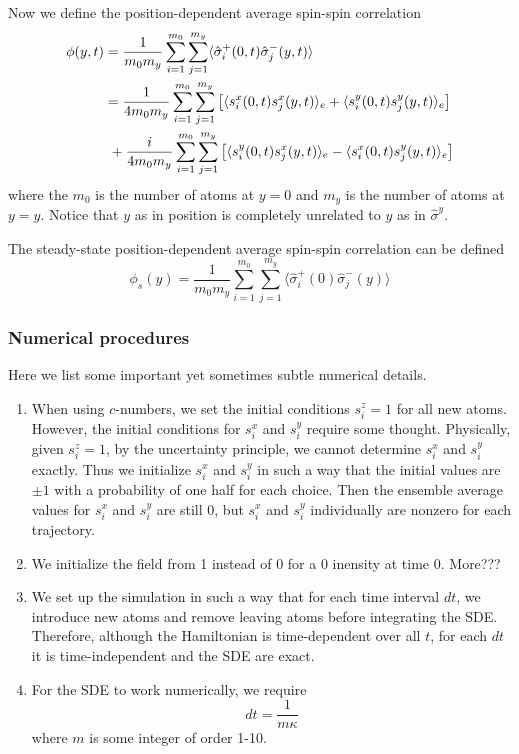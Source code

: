 \documentclass{article}
\begin{document}
\begin{enumerate}
    Now we define the position-dependent average spin-spin correlation
    \begin{align}
        \phi(y,t) &= \frac{1}{m_{0}m_{y}}\sum_{i=1}^{m_0}\sum_{j=1}^{m_y}\langle \hat{\sigma}_i^+(0,t)\hat{\sigma}_j^-(y,t)\rangle\\
        \notag          &=\frac{1}{4m_{0}m_{y}}\sum_{i=1}^{m_0}\sum_{j=1}^{m_y}\left[\langle s_i^x(0,t) s_j^x(y,t)\rangle_e+\langle s_i^y(0,t) s_j^y(y,t)\rangle_e \right]\\
        \notag          &\ +\frac{i}{4m_{0}m_{y}}\sum_{i=1}^{m_0}\sum_{j=1}^{m_y}\left[\langle s_i^y(0,t)s_j^x(y,t)\rangle_e-\langle s_i^x(0,t)s_j^y(y,t)\rangle_e \right]
    \end{align}
    where the $m_0$ is the number of atoms at $y=0$ and $m_y$ is the number of atoms at $y=y$. Notice that $y$ as in position is completely unrelated to $y$ as in $\hat{\sigma}^y$.
    
    The steady-state position-dependent average spin-spin correlation can be defined
    \begin{equation}
        \phi_s(y) = \frac{1}{m_{0}m_{y}}\sum_{i=1}^{m_0}\sum_{j=1}^{m_y}\langle \hat{\sigma}_i^+(0)\hat{\sigma}_j^-(y)\rangle
    \end{equation}
\end{enumerate}
\subsubsection{Numerical procedures}
Here we list some important yet sometimes subtle numerical details. 
\begin{enumerate}
    \item When using $c$-numbers, we set the initial conditions $s_i^z =1$ for all new atoms. However, the initial conditions for $s_i^x$ and $s_i^y$ require some thought. Physically, given $s_i^z =1$, by the uncertainty principle, we cannot determine $s_i^x$ and $s_i^y$ exactly. Thus we initialize $s_i^x$ and $s_i^y$ in such a way that the initial values are $\pm 1$ with a probability of one half for each choice. Then the ensemble average values for $s_i^x$ and $s_i^y$ are still 0, but $s_i^x$ and $s_i^y$ individually are nonzero for each trajectory.
    \item We initialize the field from 1 instead of 0 for a 0 inensity at time 0. More???
    \item We set up the simulation in such a way that for each time interval $dt$, we introduce new atoms and remove leaving atoms before integrating the SDE. Therefore, although the Hamiltonian is time-dependent over all $t$, for each $dt$ it is time-independent and the SDE are exact.
    \item For the SDE to work numerically, we require
    \begin{equation}
        dt = \frac{1}{m\kappa}
    \end{equation}
    where $m$ is some integer of order 1-10.
\end{enumerate}
\end{document}
